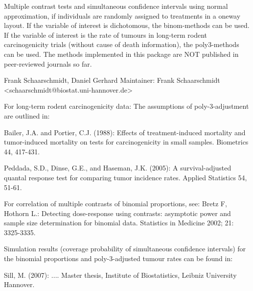 \begin{Description}\relax
Multiple contrast tests and simultaneous confidence intervals using normal approximation, if individuals
are randomly assigned to treatments in a oneway layout. If the variable of interest is dichotomous, the binom-methods can be used.
If the variable of interest is the rate of tumours in long-term rodent carcinogenicity trials (without cause of death information), the poly3-methods can be used.
The methods implemented in this package are NOT published in peer-reviewed journals so far.
\end{Description}
\begin{Details}\relax
{}
\end{Details}
\begin{Author}\relax
Frank Schaarschmidt, Daniel Gerhard
Maintainer: Frank Schaarschmidt <schaarschmidt@biostat.uni-hannover.de>
\end{Author}
\begin{References}\relax
For long-term rodent carcinogenicity data: The assumptions of poly-3-adjustment are outlined in:

Bailer, J.A. and Portier, C.J. (1988):
Effects of treatment-induced mortality and tumor-induced mortality on tests for carcinogenicity in small samples.
Biometrics 44, 417-431.

Peddada, S.D., Dinse, G.E., and Haseman, J.K. (2005):
A survival-adjusted quantal response test for comparing tumor incidence rates.
Applied Statistics 54, 51-61.

For correlation of multiple contrasts of binomial proportions, see:
Bretz F, Hothorn L.:
Detecting dose-response using contrasts: asymptotic power and sample size determination for binomial data.
Statistics in Medicine 2002; 21: 3325-3335.

Simulation results (coverage probability of simultaneous confidence intervals)
for the binomial proportions and poly-3-adjusted tumour rates can be found in:

Sill, M. (2007):
....
Master thesis, Institute of Biostatistics, Leibniz University Hannover.
\end{References}
